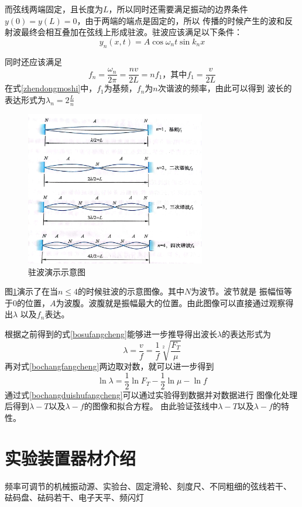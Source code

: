 \documentclass{ctexart}
\begin{document}
而弦线两端固定，且长度为$L$，所以同时还需要满足振动的边界条件$y(0)=y(L)=0$，由于两端的端点是固定的，所以
传播的时候产生的波和反射波最终会相互叠加在弦线上形成驻波。驻波应该满足以下条件：
\begin{equation}\label{zhubofangcheng}
  y_{n}(x,t)=A\cos \omega _{n} t \sin k_{n} x
\end{equation}

同时还应该满足
\begin{equation}\label{zhendongmoshi}
  f_{n}=\frac{\omega _{n}}{2\pi}=\frac{nv}{2L}=nf_{1}\mbox{，其中}f_{1}=\frac{v}{2L}
\end{equation}
在式\ref{zhendongmoshi}中，$f_{1}$为基频，$f_{n}$为$n$次谐波的频率，由此可以得到
波长的表达形式为$\lambda_{n}=2\frac{L}{n}$

\begin{figure}[b]
  \centering
  \includegraphics[height=0.3\textwidth,width=0.7\textwidth]{zhuboyanshi.jpg}
  \caption{驻波演示示意图}\label{zhuboyanshi}
\end{figure}

图\ref{zhuboyanshi}演示了在当$n\leq 4$的时候驻波的示意图像。其中$N$为波节。波节就是
振幅恒等于0的位置，$A$为波腹。波腹就是振幅最大的位置。由此图像可以直接通过观察得出$\lambda$
以及$f_{n}$表达。

根据之前得到的式\ref{bosufangcheng}能够进一步推导得出波长$\lambda$的表达形式为
\begin{equation}\label{bochangfangcheng}
  \lambda = \frac{v}{f} =\frac{1}{f}\sqrt[2]{\frac{F_{T}}{\mu}}
\end{equation}
再对式\ref{bochangfangcheng}两边取对数，就可以进一步得到
\begin{equation}\label{bochangduishufangcheng}
  \ln \lambda = \frac{1}{2} \ln F_{T}-\frac{1}{2} \ln \mu - \ln f
\end{equation}
通过式\ref{bochangduishufangcheng}可以通过实验得到数据并对数据进行
图像化处理后得到$\lambda - T$以及$\lambda -f$的图像和拟合方程。
由此验证弦线中$\lambda - T$以及$\lambda -f$的特性。

\section{实验装置器材介绍}
频率可调节的机械振动源、实验台、固定滑轮、刻度尺、不同粗细的弦线若干、
砝码盘、砝码若干、电子天平、频闪灯
\end{document}
